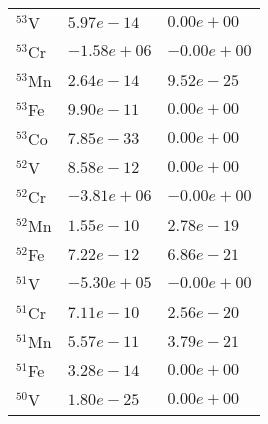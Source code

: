 \begin{tabular}{lll}
 $^{53}$V  & $5.97e-14 $                                                        & $0.00e+00 $                                                           \\
 $^{53}$Cr & $-1.58e+06 $                                                       & $-0.00e+00 $                                                          \\
 $^{53}$Mn & $2.64e-14 $                                                        & $9.52e-25 $                                                           \\
 $^{53}$Fe & $9.90e-11 $                                                        & $0.00e+00 $                                                           \\
 $^{53}$Co & $7.85e-33 $                                                        & $0.00e+00 $                                                           \\
 $^{52}$V  & $8.58e-12 $                                                        & $0.00e+00 $                                                           \\
 $^{52}$Cr & $-3.81e+06 $                                                       & $-0.00e+00 $                                                          \\
 $^{52}$Mn & $1.55e-10 $                                                        & $2.78e-19 $                                                           \\
 $^{52}$Fe & $7.22e-12 $                                                        & $6.86e-21 $                                                           \\
 $^{51}$V  & $-5.30e+05 $                                                       & $-0.00e+00 $                                                          \\
 $^{51}$Cr & $7.11e-10 $                                                        & $2.56e-20 $                                                           \\
 $^{51}$Mn & $5.57e-11 $                                                        & $3.79e-21 $                                                           \\
 $^{51}$Fe & $3.28e-14 $                                                        & $0.00e+00 $                                                           \\
 $^{50}$V  & $1.80e-25 $                                                        & $0.00e+00 $                                                           \\

\end{tabular}
